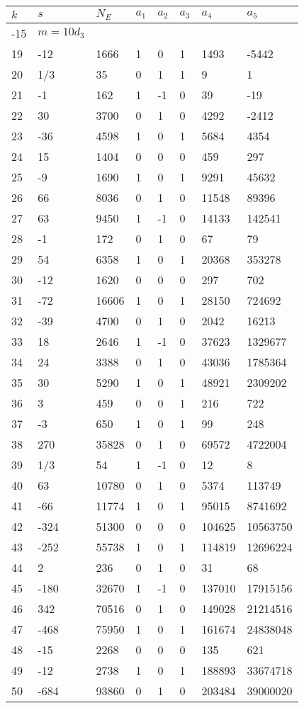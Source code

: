 \documentclass{amsart}
\begin{document}
\begin{longtable}{|l|l|l|lllll|}
\hline
$k$ & $s$ & $N_E$ & $a_1$ & $a_2$ & $a_3$ & $a_4$ & $a_5$\\
\hline
-15&$m=10d_{3}$&&\multicolumn{5}{c|}{}\\
19&-12&1666&1&0&1&1493&-5442\\
20&1/3&35&0&1&1&9&1\\
21&-1&162&1&-1&0&39&-19\\
22&30&3700&0&1&0&4292&-2412\\
23&-36&4598&1&0&1&5684&4354\\
24&15&1404&0&0&0&459&297\\
25&-9&1690&1&0&1&9291&45632\\
26&66&8036&0&1&0&11548&89396\\
27&63&9450&1&-1&0&14133&142541\\
28&-1&172&0&1&0&67&79\\
29&54&6358&1&0&1&20368&353278\\
30&-12&1620&0&0&0&297&702\\
31&-72&16606&1&0&1&28150&724692\\
32&-39&4700&0&1&0&2042&16213\\
33&18&2646&1&-1&0&37623&1329677\\
34&24&3388&0&1&0&43036&1785364\\
35&30&5290&1&0&1&48921&2309202\\
36&3&459&0&0&1&216&722\\
37&-3&650&1&0&1&99&248\\
38&270&35828&0&1&0&69572&4722004\\
39&1/3&54&1&-1&0&12&8\\
40&63&10780&0&1&0&5374&113749\\
41&-66&11774&1&0&1&95015&8741692\\
42&-324&51300&0&0&0&104625&10563750\\
43&-252&55738&1&0&1&114819&12696224\\
44&2&236&0&1&0&31&68\\
45&-180&32670&1&-1&0&137010&17915156\\
46&342&70516&0&1&0&149028&21214516\\
47&-468&75950&1&0&1&161674&24838048\\
48&-15&2268&0&0&0&135&621\\
49&-12&2738&1&0&1&188893&33674718\\
50&-684&93860&0&1&0&203484&39000020\\
\hline
\end{longtable}
\end{document}
